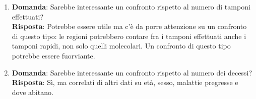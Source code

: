 \begin{enumerate}
    \item \textbf{Domanda}: Sarebbe interessante un confronto rispetto al numero di tamponi effettuati?\\\textbf{Risposta}: Potrebbe essere utile ma c'è da porre attenzione su un confronto di questo tipo: le regioni potrebbero contare fra i tamponi effettuati anche i tamponi rapidi, non solo quelli molecolari. Un confronto di questo tipo potrebbe essere fuorviante.
    \item \textbf{Domanda}: Sarebbe interessante un confronto rispetto al numero dei decessi?\\\textbf{Risposta}: Sì, ma correlati di altri dati su età, sesso, malattie pregresse e dove abitano.
\end{enumerate}
